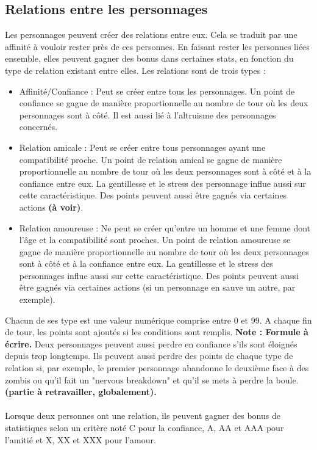 \subsection{Relations entre les personnages}
Les personnages peuvent créer des relations entre eux. Cela se traduit par une affinité à vouloir rester près de ces personnes. En faisant rester les personnes liées ensemble, elles peuvent gagner des bonus dans certaines stats, en fonction du type de relation existant entre elles. Les relations sont de trois types : 
\begin{itemize}
  \item Affinité/Confiance : Peut se créer entre tous les personnages. Un point de confiance se gagne de manière proportionnelle au nombre de tour où les deux personnages sont à côté. Il est aussi lié à l'altruisme des personnages concernés.
  \item Relation amicale : Peut se créer entre tous personnages ayant une compatibilité proche. Un point de relation amical se gagne de manière proportionnelle au nombre de tour où les deux personnages sont à côté et à la confiance entre eux. La gentillesse et le stress des personnage influe aussi sur cette caractéristique. Des points peuvent aussi être gagnés via certaines actions \textbf{(à voir)}. 
    \item Relation amoureuse : Ne peut se créer qu'entre un homme et une femme dont l'âge et la compatibilité sont proches. Un point de relation amoureuse se gagne de manière proportionnelle au nombre de tour où les deux personnages sont à côté et à la confiance entre eux. La gentillesse et le stress des personnages influe aussi sur cette caractéristique. Des points peuvent aussi être gagnés via certaines actions (si un personnage en sauve un autre, par exemple). 
\end{itemize}
Chacun de ses type est une valeur numérique comprise entre 0 et 99. A chaque fin de tour, les points sont ajoutés si les conditions sont remplis. \textbf{Note : Formule à écrire.} Deux personnages peuvent aussi perdre en confiance s'ils sont éloignés depuis trop longtemps. Ils peuvent aussi perdre des points de chaque type de relation si, par exemple, le premier personnage abandonne le deuxième face à des zombis ou qu'il fait un "nervous breakdown" et qu'il se mets à perdre la boule. \textbf{(partie à retravailler, globalement).}
\\\\
Lorsque deux personnes ont une relation, ils peuvent gagner des bonus de statistiques selon un critère noté C pour la confiance, A, AA et AAA pour l'amitié et X, XX et XXX pour l'amour. 
